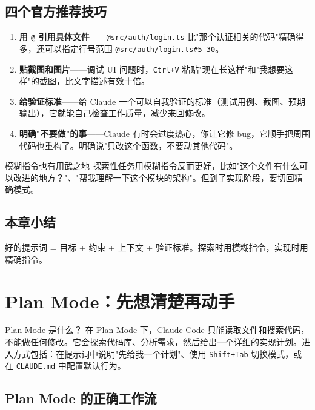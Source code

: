\documentclass[a4paper]{article}
\begin{document}
\subsection{四个官方推荐技巧}

\begin{enumerate}[leftmargin=1.5em]
  \item \textbf{用 \texttt{@} 引用具体文件}——\texttt{@src/auth/login.ts} 比"那个认证相关的代码"精确得多，还可以指定行号范围 \texttt{@src/auth/login.ts\#5-30}。
  \item \textbf{贴截图和图片}——调试 UI 问题时，\texttt{Ctrl+V} 粘贴"现在长这样"和"我想要这样"的截图，比文字描述有效十倍。
  \item \textbf{给验证标准}——给 Claude 一个可以自我验证的标准（测试用例、截图、预期输出），它就能自己检查工作质量，减少来回修改。
  \item \textbf{明确"不要做"的事}——Claude 有时会过度热心，你让它修 bug，它顺手把周围代码也重构了。明确说"只改这个函数，不要动其他代码"。
\end{enumerate}

\begin{knowledgebox}{模糊指令也有用武之地}
探索性任务用模糊指令反而更好，比如"这个文件有什么可以改进的地方？"、"帮我理解一下这个模块的架构"。但到了实现阶段，要切回精确模式。
\end{knowledgebox}

\subsection{本章小结}

好的提示词 = 目标 + 约束 + 上下文 + 验证标准。探索时用模糊指令，实现时用精确指令。

\section{Plan Mode：先想清楚再动手}

\begin{knowledgebox}{Plan Mode 是什么？}
在 Plan Mode 下，Claude Code 只能读取文件和搜索代码，不能做任何修改。它会探索代码库、分析需求，然后给出一个详细的实现计划。进入方式包括：在提示词中说明"先给我一个计划"、使用 \texttt{Shift+Tab} 切换模式，或在 \texttt{CLAUDE.md} 中配置默认行为。
\end{knowledgebox}

\subsection{Plan Mode 的正确工作流}
\end{document}
